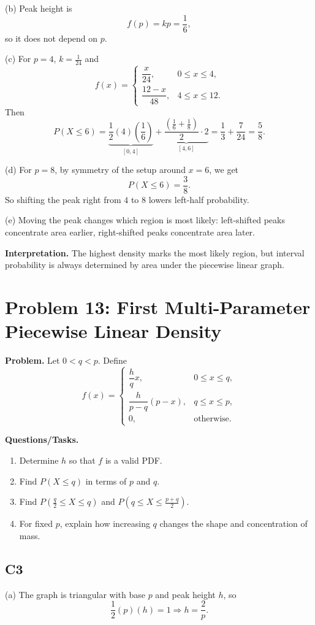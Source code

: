 (b) Peak height is
\[
f(p)=kp=\frac{1}{6},
\]
so it does not depend on $p$.

(c) For $p=4$, $k=\frac{1}{24}$ and
\[
f(x)=\begin{cases}
\dfrac{x}{24}, & 0\le x\le 4,\\
\dfrac{12-x}{48}, & 4\le x\le 12.
\end{cases}
\]
Then
\[
P(X\le 6)=\underbrace{\frac12(4)\left(\frac16\right)}_{[0,4]}+\underbrace{\frac{\left(\frac16+\frac18\right)}{2}\cdot2}_{[4,6]}=\frac13+\frac{7}{24}=\frac58.
\]

(d) For $p=8$, by symmetry of the setup around $x=6$, we get
\[
P(X\le 6)=\frac38.
\]
So shifting the peak right from $4$ to $8$ lowers left-half probability.

(e) Moving the peak changes which region is most likely: left-shifted peaks concentrate area earlier, right-shifted peaks concentrate area later.

\textbf{Interpretation.}
The highest density marks the most likely region, but interval probability is always determined by area under the piecewise linear graph.

\section{Problem 13: First Multi-Parameter Piecewise Linear Density}

\textbf{Problem.}
Let $0<q<p$. Define
\[
f(x)=\begin{cases}
\dfrac{h}{q}x, & 0\le x\le q,\\
\dfrac{h}{p-q}(p-x), & q\le x\le p,\\
0, & \text{otherwise.}
\end{cases}
\]

\textbf{Questions/Tasks.}
\begin{enumerate}
\item Determine $h$ so that $f$ is a valid PDF.
\item Find $P(X\le q)$ in terms of $p$ and $q$.
\item Find $P\!\left(\frac q2\le X\le q\right)$ and $P\!\left(q\le X\le\frac{p+q}{2}\right)$.
\item For fixed $p$, explain how increasing $q$ changes the shape and concentration of mass.
\end{enumerate}

\subsection*{C3}
(a) The graph is triangular with base $p$ and peak height $h$, so
\[
\frac12(p)(h)=1\Rightarrow h=\frac{2}{p}.
\]

